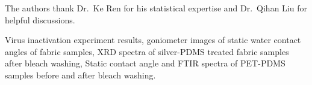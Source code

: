 \documentclass[journal=jacsat,manuscript=article]{achemso}
\begin{document}
\begin{acknowledgement}

The authors thank Dr.~Ke Ren for his statistical expertise and Dr.~Qihan Liu for helpful discussions. 

\end{acknowledgement}

\begin{suppinfo}

Virus inactivation experiment results, goniometer images of static water contact angles of fabric samples, XRD spectra%
of silver-PDMS treated fabric samples after bleach washing, Static contact angle and FTIR spectra of PET-PDMS samples before and after bleach washing. 


\end{suppinfo}


\end{document}
